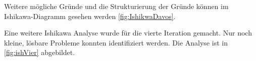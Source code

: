 Weitere mögliche Gründe und die Strukturierung der Gründe können im Ishikawa-Diagramm gesehen werden \ref{fig:IshikwaDavos}.

Eine weitere Ishikawa Analyse wurde für die vierte Iteration gemacht. Nur noch kleine, lösbare Probleme konnten identifiziert werden. Die Analyse ist in \ref{fig:ishVier} abgebildet.
